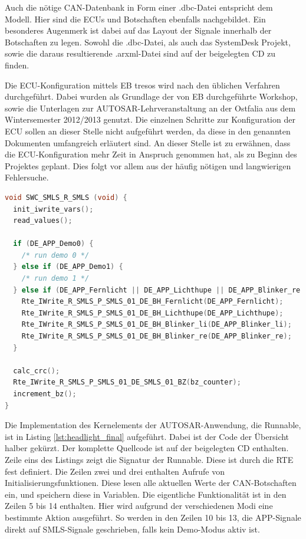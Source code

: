 \documentclass[
  a4paper,					    %
  twoside,
  DIV=calc,     				%
  bibliography=totoc,
  cleardoublepage=empty,
  ngerman,     					%
  final       					%
]{scrbook}
\begin{document}
Auch die nötige CAN-Datenbank in Form einer .dbc-Datei entspricht dem Modell. Hier sind die ECUs und Botschaften ebenfalls nachgebildet. Ein besonderes Augenmerk ist dabei auf das Layout der Signale innerhalb der Botschaften zu legen. Sowohl die .dbc-Datei, als auch das SystemDesk Projekt, sowie die daraus resultierende .arxml-Datei sind auf der beigelegten CD zu finden.

Die ECU-Konfiguration mittels EB tresos wird nach den üblichen Verfahren durchgeführt. Dabei wurden als Grundlage der von EB durchgeführte Workshop, sowie die Unterlagen zur AUTOSAR-Lehrveranstaltung an der Ostfalia aus dem Wintersemester 2012/2013 genutzt. Die einzelnen Schritte zur Konfiguration der ECU sollen an dieser Stelle nicht aufgeführt werden, da diese in den genannten Dokumenten umfangreich erläutert sind. An dieser Stelle ist zu erwähnen, dass die ECU-Konfiguration mehr Zeit in Anspruch genommen hat, als zu Beginn des Projektes geplant. Dies folgt vor allem aus der häufig nötigen und langwierigen Fehlersuche.

\begin{lstlisting}[frame=single, language=C, basicstyle=\footnotesize, caption={Implementation der Runnable}, label={lst:headlight_final}]
void SWC_SMLS_R_SMLS (void) {
  init_iwrite_vars();
  read_values();

  if (DE_APP_Demo0) {
    /* run demo 0 */
  } else if (DE_APP_Demo1) {
    /* run demo 1 */
  } else if (DE_APP_Fernlicht || DE_APP_Lichthupe || DE_APP_Blinker_re || DE_APP_Blinker_li) {
    Rte_IWrite_R_SMLS_P_SMLS_01_DE_BH_Fernlicht(DE_APP_Fernlicht);
    Rte_IWrite_R_SMLS_P_SMLS_01_DE_BH_Lichthupe(DE_APP_Lichthupe);
    Rte_IWrite_R_SMLS_P_SMLS_01_DE_BH_Blinker_li(DE_APP_Blinker_li);
    Rte_IWrite_R_SMLS_P_SMLS_01_DE_BH_Blinker_re(DE_APP_Blinker_re);	
  }

  calc_crc();
  Rte_IWrite_R_SMLS_P_SMLS_01_DE_SMLS_01_BZ(bz_counter);
  increment_bz();	
}
\end{lstlisting}

Die Implementation des Kernelements der AUTOSAR-Anwendung, die Runnable, ist in Listing \ref{lst:headlight_final} aufgeführt. Dabei ist der Code der Übersicht halber gekürzt. Der komplette Quellcode ist auf der beigelegten CD enthalten. Zeile eins des Listings zeigt die Signatur der Runnable. Diese ist durch die RTE fest definiert. Die Zeilen zwei und drei enthalten Aufrufe von Initialisierungsfunktionen. Diese lesen alle aktuellen Werte der CAN-Botschaften ein, und speichern diese in Variablen. Die eigentliche Funktionalität ist in den Zeilen 5 bis 14 enthalten. Hier wird aufgrund der verschiedenen Modi eine bestimmte Aktion ausgeführt. So werden in den Zeilen 10 bis 13, die APP-Signale direkt auf SMLS-Signale geschrieben, falls kein Demo-Modus aktiv ist.
\end{document}
